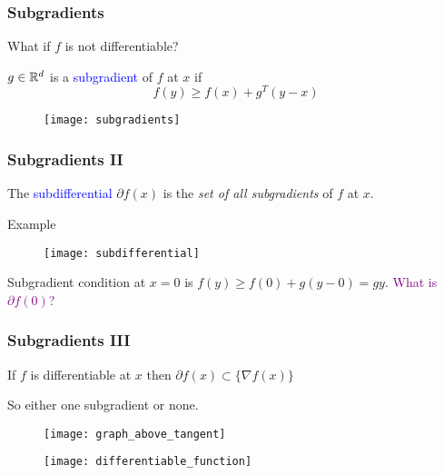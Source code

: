 \documentclass{beamer}
\begin{document}
\begin{frame}
  \frametitle{Subgradients}
  What if $f$ is not differentiable?
  \begin{definition}
    $g \in \mathbb{R}^d$ is a \textcolor{blue}{subgradient} of $f$ at $x$ if
    \begin{equation}
      f(y) \ge f(x) + g^T (y-x)
    \end{equation}
  \end{definition}
  \begin{figure}[ht]
    \centering
    \texttt{[image: subgradients]}
  \end{figure}
\end{frame}

\begin{frame}
  \frametitle{Subgradients II}
  \begin{definition}
    The \textcolor{blue}{subdifferential} $\partial f(x)$ is the \emph{set of all subgradients} of $f$ at $x$.
  \end{definition}
  Example
  \begin{figure}[ht]
    \centering
    \texttt{[image: subdifferential]}
  \end{figure}
  Subgradient condition at $x=0$ is $f(y)\ge f(0) + g(y-0) = gy$.
  \textcolor{purple}{What is $\partial f(0)$?}
\end{frame}

\begin{frame}
  \frametitle{Subgradients III}
  \begin{lemma}%
    If $f$ is differentiable at $x$ then $\partial f(x) \subset \{\nabla f(x)\}$
  \end{lemma}
  So either one subgradient or none.\\
  \begin{minipage}{0.48\textwidth}
    \begin{figure}[ht]
      \centering
      \texttt{[image: graph\_above\_tangent]}
    \end{figure}
  \end{minipage}
  \hfill
  \begin{minipage}{0.48\textwidth}
    \begin{figure}[ht]
      \centering
      \texttt{[image: differentiable\_function]}
    \end{figure}
  \end{minipage}
\end{frame}
\end{document}
